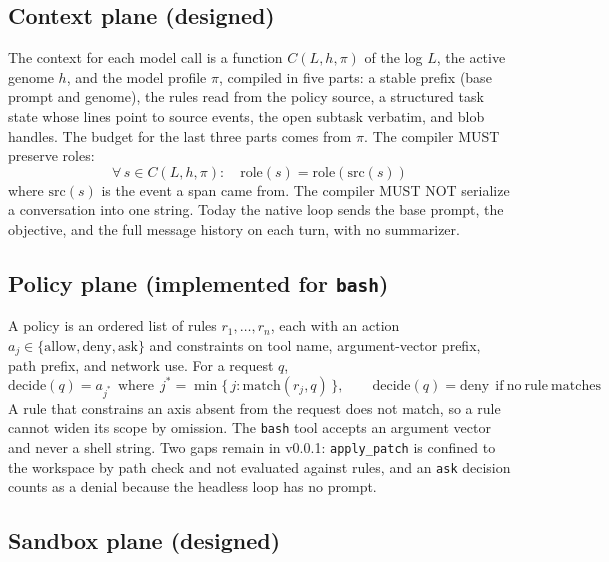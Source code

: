 \documentclass[11pt,a4paper]{article}
\begin{document}
\subsection{Context plane (designed)}

The context for each model call is a function $C(L,h,\pi)$ of the log $L$, the active genome $h$, and the model profile $\pi$, compiled in five parts: a stable prefix (base prompt and genome), the rules read from the policy source, a structured task state whose lines point to source events, the open subtask verbatim, and blob handles. The budget for the last three parts comes from $\pi$. The compiler MUST preserve roles:
\begin{equation}
\forall\, s\in C(L,h,\pi):\quad \mathrm{role}(s)=\mathrm{role}(\mathrm{src}(s))
\label{eq:role}
\end{equation}
where $\mathrm{src}(s)$ is the event a span came from. The compiler MUST NOT serialize a conversation into one string. Today the native loop sends the base prompt, the objective, and the full message history on each turn, with no summarizer.

\subsection{Policy plane (implemented for \texttt{bash})}

A policy is an ordered list of rules $r_1,\ldots,r_n$, each with an action $a_j\in\{\mathrm{allow},\mathrm{deny},\mathrm{ask}\}$ and constraints on tool name, argument-vector prefix, path prefix, and network use. For a request $q$,
\begin{equation}
\mathrm{decide}(q)= a_{j^*}\ \ \mathrm{where}\ \ j^*=\min\{\,j : \mathrm{match}(r_j,q)\,\},\qquad \mathrm{decide}(q)=\mathrm{deny}\ \ \mathrm{if\ no\ rule\ matches}
\label{eq:policy}
\end{equation}
A rule that constrains an axis absent from the request does not match, so a rule cannot widen its scope by omission. The \texttt{bash} tool accepts an argument vector and never a shell string. Two gaps remain in v0.0.1: \texttt{apply\_patch} is confined to the workspace by path check and not evaluated against rules, and an \texttt{ask} decision counts as a denial because the headless loop has no prompt.

\subsection{Sandbox plane (designed)}
\end{document}
